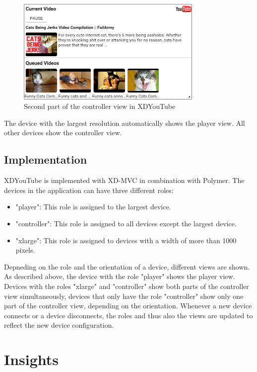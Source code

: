 \begin{figure}[H]
  \centering
    \includegraphics[width=0.8\textwidth]{images/screenshots/xdyt/controller_landscape.png}
	\caption{Second part of the controller view in XDYouTube}
	\label{fig:xdyt_controller_landscape}
\end{figure}

The device with the largest resolution automatically shows the player view. All other devices show the controller view. 

\subsection{Implementation}

XDYouTube is implemented with XD-MVC in combination with Polymer. The devices in the application can have three different roles:
\begin{itemize}
	\item "player": This role is assigned to the largest device.
	\item "controller": This role is assigned to all devices except the largest device.
	\item "xlarge": This role is assigned to devices with a width of more than 1000 pixels.
\end{itemize}
Depneding on the role and the orientation of a device, different views are shown. As described above, the device with the role "player" shows the player view. Devices with the roles "xlarge" and "controller" show both parts of the controller view simultaneously, devices that only have the role "controller" show only one part of the controller view, depending on the orientation. Whenever a new device connects or a device disconnects, the roles and thus also the views are updated to reflect the new device configuration.

\section{Insights}

